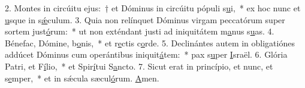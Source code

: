 2. Montes in circúitu ejus:~† et Dóminus in circúitu pópuli s\uline{u}i,~* ex hoc nunc et \uline{u}sque in s\uline{ǽ}culum.
3. Quia non relínquet Dóminus virgam peccatórum super sortem just\uline{ó}rum:~* ut non exténdant justi ad iniquitátem m\uline{a}nus s\uline{u}as.
4. Bénefac, Dómine, b\uline{o}nis,~* et r\uline{e}ctis c\uline{o}rde.
5. Declinántes autem in obligatiónes addúcet Dóminus cum operántibus iniquit\uline{á}tem:~* pax s\uline{u}per \uline{I}sraël.
6. Glória Patri, et F\uline{í}lio,~* et Spir\uline{í}tui S\uline{a}ncto.
7. Sicut erat in princípio, et nunc, et s\uline{e}mper,~* et in sǽcula sæcul\uline{ó}rum. \uline{A}men.
